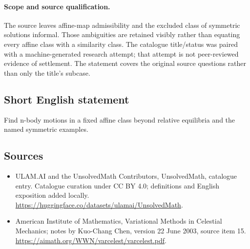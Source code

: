 \documentclass[11pt]{article}
\begin{document}
\paragraph{Scope and source qualification.}The source leaves affine-map admissibility and the excluded class of symmetric solutions informal. Those ambiguities are retained visibly rather than equating every affine class with a similarity class. The catalogue title/status was paired with a machine-generated research attempt; that attempt is not peer-reviewed evidence of settlement. The statement covers the original source questions rather than only the title’s subcase.
\subsection{Short English statement}
Find n-body motions in a fixed affine class beyond relative equilibria and the named symmetric examples.
\subsection{Sources}
\begin{itemize}
\item[\hypertarget{source:statement:1}{S1}] ULAM.AI and the UnsolvedMath Contributors, UnsolvedMath, catalogue entry. Catalogue curation under CC BY 4.0; definitions and English exposition added locally.
\url{https://huggingface.co/datasets/ulamai/UnsolvedMath}.
\item[\hypertarget{source:statement:2}{S2}] American Institute of Mathematics, Variational Methods in Celestial Mechanics; notes by Kuo-Chang Chen, version 22 June 2003, source item 15.
\url{https://aimath.org/WWN/varcelest/varcelest.pdf}.
\end{itemize}
\label{end:statement}
\end{document}
